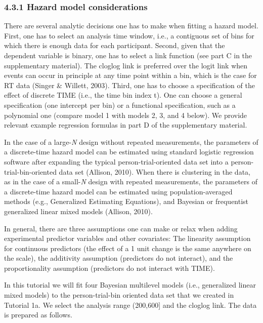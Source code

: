 \documentclass[
  man,floatsintext]{apa6}
\begin{document}
\subsubsection{4.3.1 Hazard model considerations}\label{hazard-model-considerations}

There are several analytic decisions one has to make when fitting a hazard model. First, one has to select an analysis time window, i.e., a contiguous set of bins for which there is enough data for each participant. Second, given that the dependent variable is binary, one has to select a link function (see part C in the supplementary material). The cloglog link is preferred over the logit link when events can occur in principle at any time point within a bin, which is the case for RT data (Singer \& Willett, 2003). Third, one has to choose a specification of the effect of discrete TIME (i.e., the time bin index t). One can choose a general specification (one intercept per bin) or a functional specification, such as a polynomial one (compare model 1 with models 2, 3, and 4 below). We provide relevant example regression formulas in part D of the supplementary material.

In the case of a large-\emph{N} design without repeated measurements, the parameters of a discrete-time hazard model can be estimated using standard logistic regression software after expanding the typical person-trial-oriented data set into a person-trial-bin-oriented data set (Allison, 2010). When there is clustering in the data, as in the case of a small-\emph{N} design with repeated measurements, the parameters of a discrete-time hazard model can be estimated using population-averaged methods (e.g., Generalized Estimating Equations), and Bayesian or frequentist generalized linear mixed models (Allison, 2010).

In general, there are three assumptions one can make or relax when adding experimental predictor variables and other covariates: The linearity assumption for continuous predictors (the effect of a 1 unit change is the same anywhere on the scale), the additivity assumption (predictors do not interact), and the proportionality assumption (predictors do not interact with TIME).

In this tutorial we will fit four Bayesian multilevel models (i.e., generalized linear mixed models) to the person-trial-bin oriented data set that we created in Tutorial 1a. We select the analysis range (200,600{]} and the cloglog link. The data is prepared as follows.
\end{document}
